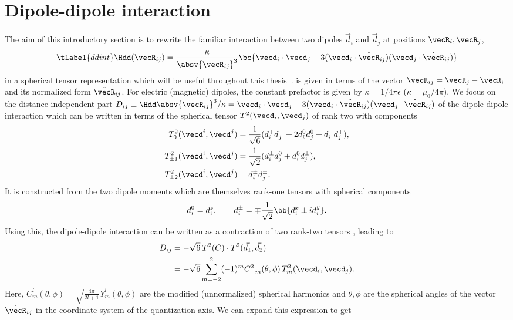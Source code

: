 \section{Dipole-dipole interaction}
The aim of this introductory section is to rewrite the familiar interaction between two dipoles $\vec{d}_i$ and $\vec{d}_j$ at positions $\vecR_i, \vecR_j$,
\begin{align} \tlabel{ddint}
\Hdd(\vecR_{ij}) = \frac{\kappa}{\absv{\vecR_{ij}}^3} \bc{ \vecd_i \cdot \vecd_j -3 (\vecd_i \cdot \hat{\vecR}_{ij})(\vecd_j \cdot \hat{\vecR}_{ij}) }
\end{align}
in a spherical tensor representation which will be useful throughout this thesis~\cite{Micheli2007,Gorshkov2011c}.
 is given in terms of the vector $\vecR_{ij} = \vecR_j - \vecR_i$ and its normalized form $\hat{\vecR}_{ij}$.
For electric (magnetic) dipoles, the constant prefactor is given by $\kappa = 1/4\pi\epsilon$ ($\kappa=\mu_0/4\pi$).
We focus on the distance-independent part $D_{ij} \equiv \Hdd \absv{\vecR_{ij}}^3/\kappa=\vecd_i \cdot \vecd_j -3 (\vecd_i \cdot \hat{\vecR}_{ij})(\vecd_j \cdot \hat{\vecR}_{ij})$ of the dipole-dipole interaction which can be written in terms of the spherical tensor $T^2(\vecd_i, \vecd_j)$ of rank two with components
\begin{align}
T^2_0(\vecd^i, \vecd^j) &= \frac{1}{\sqrt{6}} (d_i^+ d_j^- + 2d_i^0 d_j^0 + d_i^{-} d_j^{+}), \\
T^2_{\pm 1}(\vecd^i, \vecd^j) &= \frac{1}{\sqrt{2}} (d_i^{\pm} d_j^0 + d_i^0 d_j^{\pm}), \\
T^2_{\pm 2}(\vecd^i, \vecd^j) &= d_i^{\pm} d_j^{\pm}.
\end{align}
It is constructed from the two dipole moments which are themselves rank-one tensors with spherical components
\begin{align}
d^0_i = d^z_i, \qquad d_i^\pm = \mp\frac{1}{\sqrt{2}}\bb{d_i^x\pm i d_i^y}.
\end{align}
Using this, the dipole-dipole interaction can be written as a contraction of two rank-two tensors \cite{Brown2003}, leading to
\begin{align}
    D_{ij} &= -\sqrt{6} \: T^2(C)\cdot T^2(\vec{d_1},\vec{d_2})\\
           &= -\sqrt{6}  \sum_{m=-2}^{2} (-1)^m C^2_{-m}(\theta,\phi) \, T^2_m(\vecd_i,\vecd_j).
\end{align}
Here, $C^l_m(\theta,\phi)=\sqrt{\frac{4\pi}{2l+1}} Y^l_m(\theta,\phi)$ are the modified (unnormalized) spherical harmonics and $\theta, \phi$ are the spherical angles of the vector $\hat{\vecR}_{ij}$ in the coordinate system of the quantization axis. We can expand this expression to get
